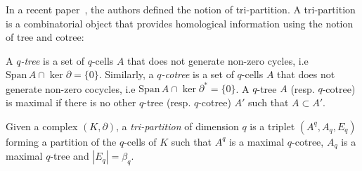 \documentclass[runningheads]{llncs}
\DeclareMathOperator{\im}{im}	%
\newcommand\Span{\mathrm{Span}\,}
\newcommand{\dr}{\partial}
\newcommand{\commentYS}[1]{{\textit{\color{blue}\textbf{YS}: #1}}}
\begin{document}
    In a recent paper~\cite{edelsbrunner-tri_partition}, the authors defined the notion of tri-partition.
    A tri-partition is a combinatorial object that provides homological information using the notion of tree and cotree: %
    \begin{definition}\label{def:co-tree}
        A \emph{$q$-tree} is a set of $q$-cells $A$ that does not generate non-zero cycles, i.e $\Span A \cap \ker\dr = \{0\}$.
        Similarly, a \emph{$q$-cotree} is a set of $q$-cells $A$ that does not generate non-zero cocycles, i.e $\Span A \cap \ker\dr^\ast = \{0\}$.
        A $q$-tree $A$ (resp. $q$-cotree) is maximal if there is no other $q$-tree (resp. $q$-cotree) $A'$ such that $A\subset A'$.
    \end{definition}
    
    \begin{definition}\label{def:tri-partition}
        Given a complex $(K,\dr)$, a \emph{tri-partition} of dimension $q$ is a triplet $(A^q,A_q,E_q)$ forming a partition of the $q$-cells of $K$ such that $A^q$ is a maximal $q$-cotree, $A_q$ is a maximal $q$-tree and $|E_q|=\beta_q$.
    \end{definition}
    
\end{document}
